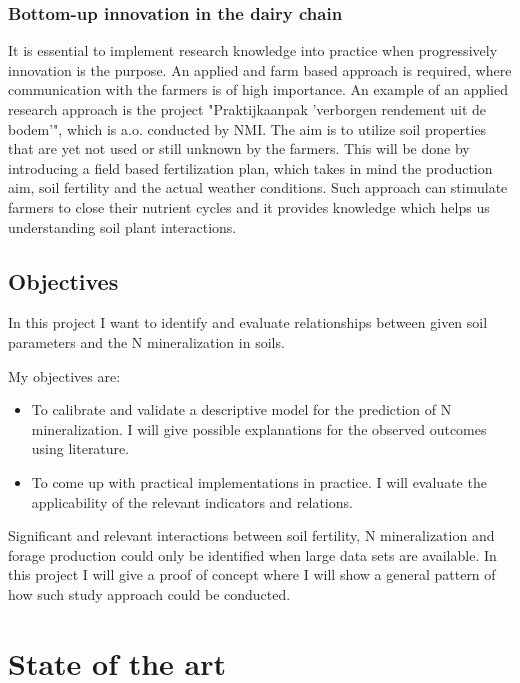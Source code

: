 \documentclass[10pt,twoside,dutch,english]{report}
\begin{document}
		\subsection{Bottom-up innovation in the dairy chain}
		 It is essential to implement research knowledge into practice when progressively innovation is the purpose. An applied and farm based approach is required, where communication with the farmers is of high importance. An example of an applied research approach is the project "Praktijkaanpak 'verborgen rendement uit de bodem'", which is a.o. conducted by NMI. The aim is to utilize soil properties that are yet not used or still unknown by the farmers. This will be done by introducing a field based fertilization plan, which takes in mind the production aim, soil fertility and the actual weather conditions. Such approach can stimulate farmers to close their nutrient cycles and it provides knowledge which helps us understanding soil plant interactions. 
		
	\section{Objectives}
			In this project I want to identify and evaluate relationships between given soil parameters and the N mineralization in soils.
			
			
			My objectives are:
			\begin{itemize}
				\item   To calibrate and validate a descriptive model for the prediction of N mineralization. I will give possible explanations for the observed outcomes using literature.
				\item	To come up with practical implementations in practice. I will evaluate the applicability of the relevant indicators and relations.
				
			\end{itemize}
			
			Significant and relevant interactions between soil fertility, N mineralization and forage production could only be identified when large data sets are available. In this project I will give a proof of concept where I will show a general pattern of how such study approach could be conducted. 
			

\chapter{State of the art} %
	\label{chap: state of the art}
\end{document}
